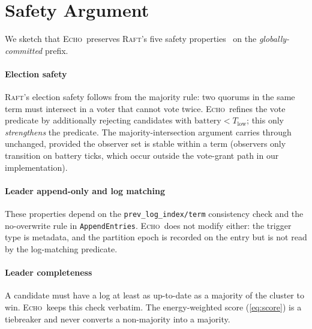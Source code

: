 \documentclass[conference]{IEEEtran}
\newcommand{\echoproto}{\textsc{Echo}\xspace}
\newcommand{\raftproto}{\textsc{Raft}\xspace}
\begin{document}
%

\section{Safety Argument}\label{sec:safety}

We sketch that \echoproto\ preserves \raftproto's five safety
properties~\cite{ongaro2014raft,howard2021arc} on the
\emph{globally-committed} prefix.

\paragraph{Election safety}
\raftproto's election safety follows from the majority rule: two
quorums in the same term must intersect in a voter that cannot vote
twice. \echoproto\ refines the vote predicate by additionally rejecting
candidates with $\text{battery} < T_{\text{low}}$; this only
\emph{strengthens} the predicate. The majority-intersection argument
carries through unchanged, provided the observer set is stable within a
term (observers only transition on battery ticks, which occur outside
the vote-grant path in our implementation).

\paragraph{Leader append-only and log matching}
These properties depend on the \texttt{prev\_log\_index/term}
consistency check and the no-overwrite rule in \texttt{AppendEntries}.
\echoproto\ does not modify either: the trigger type is metadata, and
the partition epoch is recorded on the entry but is not read by the
log-matching predicate.

\paragraph{Leader completeness}
A candidate must have a log at least as up-to-date as a majority of the
cluster to win. \echoproto\ keeps this check verbatim. The
energy-weighted score (\ref{eq:score}) is a tiebreaker and never
converts a non-majority into a majority.
\end{document}

